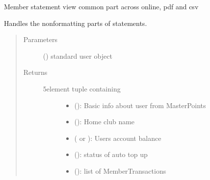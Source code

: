 \documentclass[letterpaper,10pt,english]{sphinxmanual}
\begin{document}
\begin{fulllineitems}
\label{\detokenize{payments:payments.views.statement_common}}
Member statement view \sphinxhyphen{} common part across online, pdf and csv

Handles the non\sphinxhyphen{}formatting parts of statements.
\begin{quote}\begin{description}
\item[{Parameters}] \leavevmode
{} ({\hyperref[\detokenize{accounts:accounts.models.User}]{}}) \textendash{} standard user object

\item[{Returns}] \leavevmode
\begin{description}
\item[{5\sphinxhyphen{}element tuple containing}] \leavevmode\begin{itemize}
\item {} 
 (): Basic info about user from MasterPoints

\item {} 
 (): Home club name

\item {} 
 ( or ): Users account balance

\item {} 
 (): status of auto top up

\item {} 
 (): list of MemberTransactions

\end{itemize}

\end{description}


\end{description}\end{quote}

\end{fulllineitems}

\end{document}
